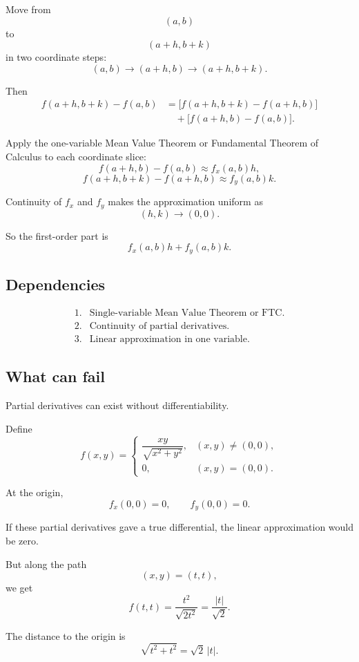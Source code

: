 Move from
\[
    (a,b)
\]
to
\[
    (a+h,b+k)
\]
in two coordinate steps:
\[
    (a,b)\to(a+h,b)\to(a+h,b+k).
\]

Then
\[
\begin{aligned}
f(a+h,b+k)-f(a,b)
&=
\bigl[f(a+h,b+k)-f(a+h,b)\bigr]\\
&\quad+
\bigl[f(a+h,b)-f(a,b)\bigr].
\end{aligned}
\]

Apply the one-variable Mean Value Theorem or Fundamental Theorem of Calculus to each
coordinate slice:
\[
    f(a+h,b)-f(a,b)
    \approx
    f_x(a,b)h,
\]
\[
    f(a+h,b+k)-f(a+h,b)
    \approx
    f_y(a,b)k.
\]

Continuity of \(f_x\) and \(f_y\) makes the approximation uniform as
\[
    (h,k)\to(0,0).
\]

So the first-order part is
\[
\boxed{
    f_x(a,b)h+f_y(a,b)k.
}
\]

\subsection*{Dependencies}

\[
\begin{array}{ll}
1. & \text{Single-variable Mean Value Theorem or FTC.}\\[1mm]
2. & \text{Continuity of partial derivatives.}\\[1mm]
3. & \text{Linear approximation in one variable.}
\end{array}
\]

\subsection*{What can fail}

Partial derivatives can exist without differentiability.

Define
\[
    f(x,y)=
    \begin{cases}
    \dfrac{xy}{\sqrt{x^2+y^2}}, & (x,y)\ne(0,0),\\[2mm]
    0, & (x,y)=(0,0).
    \end{cases}
\]

At the origin,
\[
    f_x(0,0)=0,
    \qquad
    f_y(0,0)=0.
\]

If these partial derivatives gave a true differential, the linear approximation would be
zero.

But along the path
\[
    (x,y)=(t,t),
\]
we get
\[
    f(t,t)=\frac{t^2}{\sqrt{2t^2}}=\frac{|t|}{\sqrt2}.
\]

The distance to the origin is
\[
    \sqrt{t^2+t^2}=\sqrt2\,|t|.
\]

